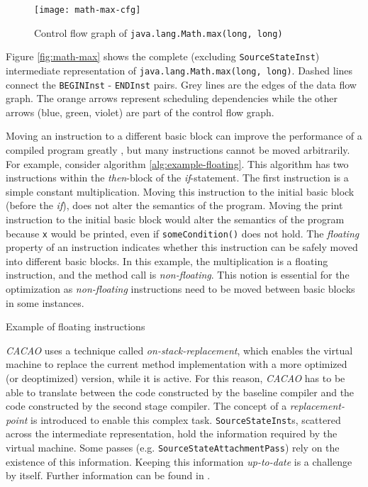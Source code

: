 \documentclass[draft, final]{vutinfth} %
\begin{document}
\begin{figure}
\center
\texttt{[image: math-max-cfg]}
\caption{Control flow graph of \texttt{java.lang.Math.max(long, long)} }
\label{fig:math-max-cfg}
\end{figure}

Figure \ref{fig:math-max} shows the complete (excluding \texttt{SourceStateInst}) intermediate representation of \texttt{java.lang.Math.max(long, long)}. Dashed lines connect the \texttt{BEGINInst} - \texttt{ENDInst} pairs. Grey lines are the edges of the data flow graph. The orange arrows represent scheduling dependencies while the other arrows (blue, green, violet) are part of the control flow graph.

Moving an instruction to a different basic block can improve the performance of a compiled program greatly \cite{Click95}, but many instructions cannot be moved arbitrarily. For example, consider algorithm \ref{alg:example-floating}. This algorithm has two instructions within the \emph{then}-block of the \emph{if}-statement. The first instruction is a simple constant multiplication. Moving this instruction to the initial basic block (before the \emph{if}), does not alter the semantics of the program. Moving the print instruction to the initial basic block would alter the semantics of the program because \texttt{x} would be printed, even if \texttt{someCondition()} does not hold. The \emph{floating} property of an instruction indicates whether this instruction can be safely moved into different basic blocks. In this example, the multiplication is a floating instruction, and the method call is \emph{non-floating}. This notion is essential for the optimization as \emph{non-floating} instructions need to be moved between basic blocks in some instances.

\begin{algorithm}[H]
\caption{Example of floating instructions}
\label{alg:example-floating}
\end{algorithm}

\emph{CACAO} uses a technique called \emph{on-stack-replacement}, which enables the virtual machine to replace the current method implementation with a more optimized (or deoptimized) version, while it is active. For this reason, \emph{CACAO} has to be able to translate between the code constructed by the baseline compiler and the code constructed by the second stage compiler. The concept of a \emph{replacement-point} is introduced to enable this complex task. \texttt{SourceStateInst}s, scattered across the intermediate representation, hold the information required by the virtual machine. Some passes (e.g. \texttt{SourceStateAttachmentPass}) rely on the existence of this information. Keeping this information \emph{up-to-date} is a challenge by itself. Further information can be found in \cite{Eisl13}.
\end{document}
